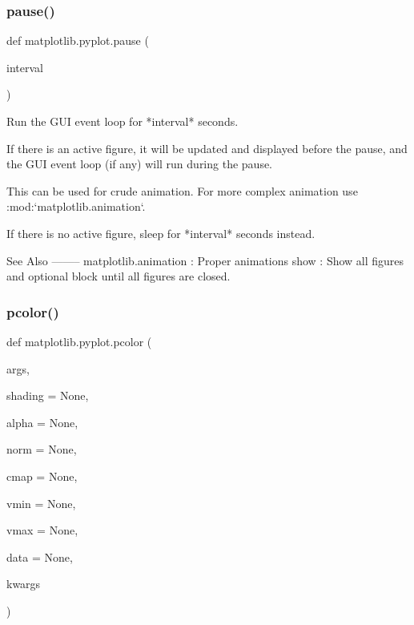 \mbox{\label{namespacematplotlib_1_1pyplot_ab75eb177cd56bbe05c86b7953ac4f694}} 
\subsubsection{\texorpdfstring{pause()}{pause()}}
{\footnotesize\ttfamily def matplotlib.\+pyplot.\+pause (\begin{DoxyParamCaption}\item[{}]{interval }\end{DoxyParamCaption})}

\begin{DoxyVerb}Run the GUI event loop for *interval* seconds.

If there is an active figure, it will be updated and displayed before the
pause, and the GUI event loop (if any) will run during the pause.

This can be used for crude animation.  For more complex animation use
:mod:`matplotlib.animation`.

If there is no active figure, sleep for *interval* seconds instead.

See Also
--------
matplotlib.animation : Proper animations
show : Show all figures and optional block until all figures are closed.
\end{DoxyVerb}
 \mbox{\label{namespacematplotlib_1_1pyplot_a3911268d9c0f5a5da39c7cd3fa04a2ef}} 
\subsubsection{\texorpdfstring{pcolor()}{pcolor()}}
{\footnotesize\ttfamily def matplotlib.\+pyplot.\+pcolor (\begin{DoxyParamCaption}\item[{}]{args,  }\item[{}]{shading = {\ttfamily None},  }\item[{}]{alpha = {\ttfamily None},  }\item[{}]{norm = {\ttfamily None},  }\item[{}]{cmap = {\ttfamily None},  }\item[{}]{vmin = {\ttfamily None},  }\item[{}]{vmax = {\ttfamily None},  }\item[{}]{data = {\ttfamily None},  }\item[{}]{kwargs }\end{DoxyParamCaption})}

